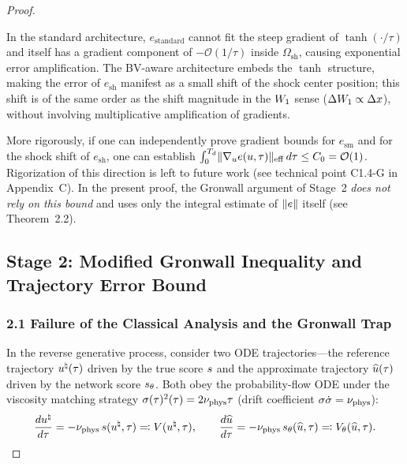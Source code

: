 \begin{proof}
\begin{remark}
In the standard architecture, $e_{\mathrm{standard}}$ cannot fit the steep gradient of $\tanh(\cdot/\tau)$ and itself has a gradient component of $-\mathcal{O}(1/\tau)$ inside $\Omega_{\mathrm{sh}}$, causing exponential error amplification.
The BV-aware architecture embeds the $\tanh$ structure, making the error of $e_{\mathrm{sh}}$ manifest as a small shift of the shock center position; this shift is of the same order as the shift magnitude in the $W_{1}$ sense ($\Delta W_{1} \propto \Delta x$), without involving multiplicative amplification of gradients.

More rigorously, if one can independently prove gradient bounds for $e_{\mathrm{sm}}$ and for the shock shift of $e_{\mathrm{sh}}$, one can establish
$\int_0^{T_d} \lVert \nabla_u e(u,\tau) \rVert_{\mathrm{eff}} \, d\tau \leq C_0 = \mathcal{O}(1)$.
Rigorization of this direction is left to future work (see technical point C1.4-G in Appendix~C).
In the present proof, the Gronwall argument of Stage~2 \emph{does not rely on this bound} and uses only the integral estimate of $\lVert e \rVert$ itself (see Theorem~2.2).
\end{remark}

\subsection{Stage 2: Modified Gronwall Inequality and Trajectory Error Bound}\label{sec:stage2}

\subsubsection{2.1 Failure of the Classical Analysis and the Gronwall Trap}

In the reverse generative process, consider two ODE trajectories---the reference trajectory $u^{\natural}(\tau)$ driven by the true score $s$ and the approximate trajectory $\widehat{u}(\tau)$ driven by the network score $s_{\theta}$.
Both obey the probability-flow ODE under the viscosity matching strategy $\sigma(\tau)^2(\tau) = 2\nu_{\mathrm{phys}} \tau$ (drift coefficient $\sigma \dot\sigma = \nu_{\mathrm{phys}}$):
\begin{equation}\label{eq:ode-pair}
  \frac{d u^{\natural}}{d\tau} = -\nu_{\mathrm{phys}} \, s(u^{\natural}, \tau) \eqqcolon V(u^{\natural}, \tau), \qquad
  \frac{d \widehat{u}}{d\tau} = -\nu_{\mathrm{phys}} \, s_{\theta}(\widehat{u}, \tau) \eqqcolon V_\theta(\widehat{u}, \tau).
\end{equation}


\end{proof}
